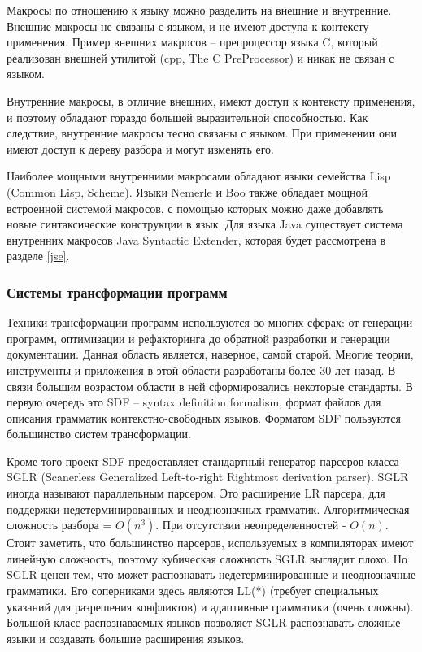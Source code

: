 \documentclass[a4paper,12pt]{article}
\begin{document}
Макросы по отношению к языку можно разделить на внешние и внутренние.
Внешние макросы не связаны с языком, и не имеют доступа к контексту применения.
Пример внешних макросов -- препроцессор языка C, который реализован внешней
утилитой (cpp, The C PreProcessor) и никак не связан с языком.

Внутренние макросы, в отличие внешних, имеют доступ к контексту применения, и
поэтому обладают гораздо большей выразительной способностью. Как следствие,
внутренние макросы тесно связаны с языком. При применении они имеют доступ к
дереву разбора и могут изменять его.

Наиболее мощными внутренними макросами обладают языки семейства Lisp
(Common Lisp, Scheme). Языки Nemerle и Boo также обладает мощной встроенной
системой макросов, с помощью которых можно даже добавлять новые синтаксические
конструкции в язык. Для языка Java существует система внутренних макросов Java
Syntactic Extender, которая будет рассмотрена в разделе \ref{jse}.

\subsubsection*{Системы трансформации программ}
Техники трансформации программ используются во многих сферах: от генерации
программ, оптимизации и рефакторинга до обратной разработки и генерации
документации.
Данная область является, наверное, самой старой. Многие теории, инструменты и
приложения в этой области разработаны более 30 лет назад.
В связи большим возрастом области в ней сформировались некоторые стандарты.
В первую очередь это SDF \cite{sdf} -- syntax definition formalism, формат
файлов для описания грамматик контекстно-свободных языков. Форматом SDF пользуются
большинство систем трансформации.

Кроме того проект SDF предоставляет стандартный генератор парсеров класса SGLR
(Scanerless Generalized Left-to-right Rightmost derivation parser). SGLR иногда
называют параллельным парсером. Это расширение LR парсера, для поддержки
недетерминированных и неоднозначных грамматик. Алгоритмическая сложность разбора
= $O(n^3)$. При отсутствии неопределенностей - $O(n)$. Стоит заметить, что
большинство парсеров, используемых в компиляторах имеют линейную сложность,
поэтому кубическая сложность SGLR выглядит плохо. Но SGLR ценен тем, что может
распознавать недетерминированные и неоднозначные грамматики. Его соперниками
здесь являются LL(*) (требует специальных указаний для разрешения конфликтов) и
адаптивные грамматики (очень сложны). Большой класс распознаваемых языков
позволяет SGLR распознавать сложные языки и создавать большие расширения языков.
\end{document}

